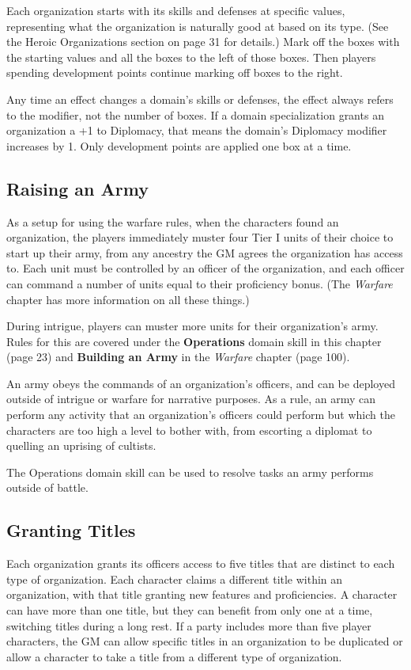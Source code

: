 \documentclass[10pt,a4paper,twoside,bg=print,twocolumn,openany,nodeprecatedcode]{dndbook}
\begin{document}
Each organization starts with its skills and defenses at specific values, representing what the organization is naturally good at based on its type. (See the Heroic Organizations section on page 31 for details.) Mark off the boxes with the starting values and all the boxes to the left of those boxes. Then players spending development points continue marking off boxes to the right.

Any time an effect changes a domain's skills or defenses, the effect always refers to the modifier, not the number of boxes. If a domain specialization grants an organization a +1 to Diplomacy, that means the domain's Diplomacy modifier increases by 1. Only development points are applied one box at a time.

\subsection{Raising an Army}
As a setup for using the warfare rules, when the characters found an organization, the players immediately muster four Tier I units of their choice to start up their army, from any ancestry the GM agrees the organization has access to. Each unit must be controlled by an officer of the organization, and each officer can command a number of units equal to their proficiency bonus. (The \textit{Warfare} chapter has more information on all these things.)

During intrigue, players can muster more units for their organization's army. Rules for this are covered under the \textbf{Operations} domain skill in this chapter (page 23) and \textbf{Building an Army} in the \textit{Warfare} chapter (page 100).

An army obeys the commands of an organization's officers, and can be deployed outside of intrigue or warfare for narrative purposes. As a rule, an army can perform any activity that an organization's officers could perform but which the characters are too high a level to bother with, from escorting a diplomat to quelling an uprising of cultists.

The Operations domain skill can be used to resolve tasks an army performs outside of battle.

\subsection{Granting Titles}
Each organization grants its officers access to five titles that are distinct to each type of organization. Each character claims a different title within an organization, with that title granting new features and proficiencies. A character can have more than one title, but they can benefit from only one at a time, switching titles during a long rest. If a party includes more than five player characters, the GM can allow specific titles in an organization to be duplicated or allow a character to take a title from a different type of organization.
\end{document}
